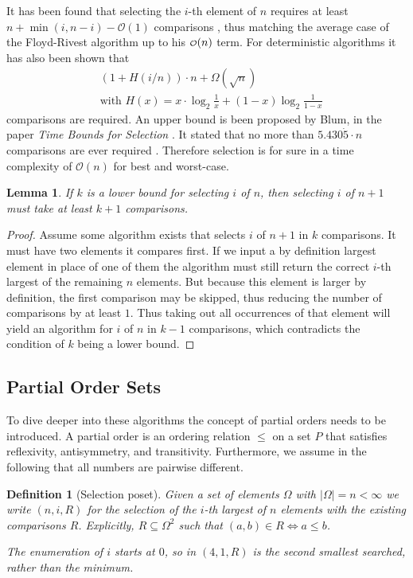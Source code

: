 \documentclass[10pt,journal,compsoc]{IEEEtran}
\newcommand\smallO{
  \mathchoice
    {{\scriptstyle\mathcal{O}}}%
    {{\scriptstyle\mathcal{O}}}%
    {{\scriptscriptstyle\mathcal{O}}}%
    {\scalebox{.50}{$\scriptscriptstyle\mathcal{O}$}}%
  }
\newtheorem{lemma}{Lemma}
\newtheorem{definition}{Definition}
\begin{document}
It has been found that selecting the $i$-th element of $n$ requires at least $n+\min(i,n-i)-\mathcal{O}(1)$ comparisons , thus matching the average case of the Floyd-Rivest algorithm up to his $\smallO(n)$ term.
For deterministic algorithms it has also been shown that
\begin{eqnarray*}
  &\left (1 + H(i/n) \right ) \cdot n + \Omega(\sqrt n) \\
  &\text{with~} H(x) = x \cdot \log_2 \frac{1}{x} + (1-x) \log_2 \frac{1}{1-x}
\end{eqnarray*}
comparisons are required.
An upper bound is been proposed by Blum, in the paper \textit{Time Bounds for Selection} \cite{Blum1972}.
It stated that no more than $5.430\dot{5} \cdot n$ comparisons are ever required .
Therefore selection is for sure in a time complexity of $\mathcal{O}(n)$ for best and worst-case.

\begin{lemma} \label{lemma:previous_next_poset}
  If $k$ is a lower bound for selecting $i$ of $n$, then selecting $i$ of $n + 1$ must take at least $k + 1$ comparisons.
\end{lemma}

\begin{proof}
  Assume some algorithm exists that selects $i$ of $n + 1$ in $k$ comparisons.
  It must have two elements it compares first.
  If we input a by definition largest element in place of one of them the algorithm must still return the correct $i$-th largest of the remaining $n$ elements.
  But because this element is larger by definition, the first comparison may be skipped, thus reducing the number of comparisons by at least $1$.
  Thus taking out all occurrences of that element will yield an algorithm for $i$ of $n$ in $k - 1$ comparisons, which contradicts the condition of $k$ being a lower bound.
\end{proof}

\subsection{Partial Order Sets}
To dive deeper into these algorithms the concept of partial orders needs to be introduced.
A partial order is an ordering relation $\leq$ on a set $P$ that satisfies reflexivity, antisymmetry, and transitivity.
Furthermore, we assume in the following that all numbers are pairwise different.

\begin{definition}[Selection poset]
  Given a set of elements $\Omega$ with $|\Omega| = n < \infty$ we write $(n, i, R)$ for the selection of the $i$-th largest of $n$ elements with the existing comparisons $R$.
  Explicitly, $R\subseteq\Omega^2$ such that $(a, b)\in R \Longleftrightarrow a \leq b$.

  The enumeration of $i$ starts at $0$, so in $(4, 1, R)$ is the second smallest searched, rather than the minimum.
\end{definition}
\end{document}
